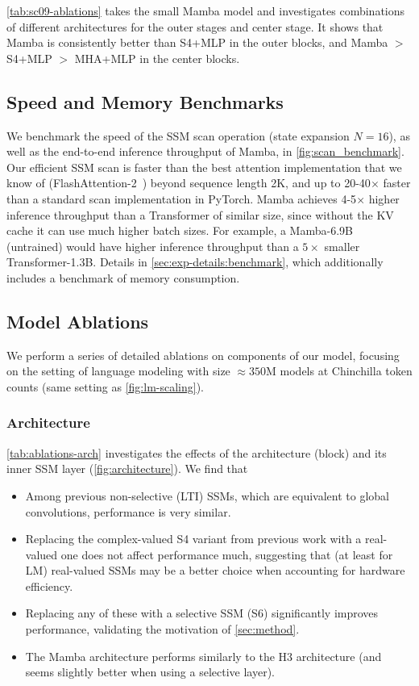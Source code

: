 \ref{tab:sc09-ablations} takes the small Mamba model and investigates combinations of different architectures for the outer stages and center stage. It shows that Mamba is consistently better than S4+MLP in the outer blocks, and Mamba $>$ S4+MLP $>$ MHA+MLP in the center blocks.

\subsection{Speed and Memory Benchmarks}
\label{sec:exp:benchmark}

We benchmark the speed of the SSM scan operation (state expansion $N=16$), as well as the end-to-end inference throughput of Mamba, in \ref{fig:scan_benchmark}.
Our efficient SSM scan is faster than the best attention implementation that we know of
(FlashAttention-2~\citep{dao2023flashattention2}) beyond sequence length 2K, and up to 20-40$\times$ faster than a standard scan implementation in PyTorch. Mamba achieves 4-5$\times$ higher inference throughput than a Transformer of similar size, since without the KV cache it can use much higher batch sizes. For example, a Mamba-6.9B (untrained) would have higher inference throughput than a
$5\times$ smaller Transformer-1.3B. Details in \ref{sec:exp-details:benchmark}, which additionally includes a benchmark of memory consumption.

\subsection{Model Ablations}
\label{sec:exp:ablations}

We perform a series of detailed ablations on components of our model, focusing on the setting of language modeling with size $\approx 350$M models at Chinchilla token counts (same setting as \ref{fig:lm-scaling}).

\subsubsection{Architecture}
\ref{tab:ablations-arch} investigates the effects of the architecture (block) and its inner SSM layer (\ref{fig:architecture}).
We find that

\begin{itemize}[leftmargin=*,itemsep=0pt]
  \item Among previous non-selective (LTI) SSMs, which are equivalent to global convolutions, performance is very similar.
  \item Replacing the complex-valued S4 variant from previous work with a real-valued one does not affect performance much, suggesting that (at least for LM) real-valued SSMs may be a better choice when accounting for hardware efficiency.
  \item Replacing any of these with a selective SSM (S6) significantly improves performance, validating the motivation of \ref{sec:method}.
  \item The Mamba architecture performs similarly to the H3 architecture (and seems slightly better when using a selective layer).
\end{itemize}

